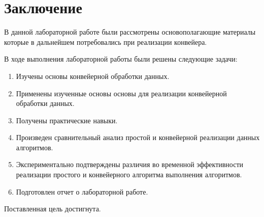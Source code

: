 \chapter*{Заключение}

В данной лабораторной работе были рассмотрены основополагающие материалы которые в дальнейшем потребовались при реализации конвейера. 


В ходе выполнения лабораторной работы были решены следующие задачи:

\begin{enumerate}
	\item Изучены основы конвейерной обработки данных.
	\item Применены изученные основы основы для реализации конвейерной обработки данных.
	
	\item Получены практические навыки.
	\item Произведен сравнительный анализ простой и конвейерной реализации данных алгоритмов.
	\item Экспериментально подтверждены различия во временной эффективности реализации простого и конвейерного алгоритма выполнения алгоритмов.
	
	\item Подготовлен отчет о лабораторной работе.
\end{enumerate}

Поставленная цель достигнута.

